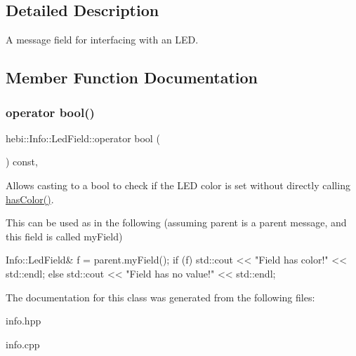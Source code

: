\subsection{Detailed Description}
A message field for interfacing with an L\+ED. 

\subsection{Member Function Documentation}
\mbox{\label{classhebi_1_1Info_1_1LedField_ad01bb0b217fa57dd74e288cc70c0d59f}} 
\subsubsection{\texorpdfstring{operator bool()}{operator bool()}}
{\footnotesize\ttfamily hebi\+::\+Info\+::\+Led\+Field\+::operator bool (\begin{DoxyParamCaption}{ }\end{DoxyParamCaption}) const\hspace{0.3cm}{\ttfamily [inline]}, {\ttfamily [explicit]}}



Allows casting to a bool to check if the L\+ED color is set without directly calling {\ttfamily \hyperlink{classhebi_1_1Info_1_1LedField_aa78e496273712fe789e5cc70b27831b4}{has\+Color()}}. 

This can be used as in the following (assuming \textquotesingle{}parent\textquotesingle{} is a parent message, and this field is called \textquotesingle{}my\+Field\textquotesingle{}) 
\begin{DoxyCode}
Info::LedField& f = parent.myField();
\textcolor{keywordflow}{if} (f)
  std::cout << \textcolor{stringliteral}{"Field has color!"} << std::endl;
\textcolor{keywordflow}{else}
  std::cout << \textcolor{stringliteral}{"Field has no value!"} << std::endl;
\end{DoxyCode}
 

The documentation for this class was generated from the following files\+:\begin{DoxyCompactItemize}
\item 
info.\+hpp\item 
info.\+cpp\end{DoxyCompactItemize}

